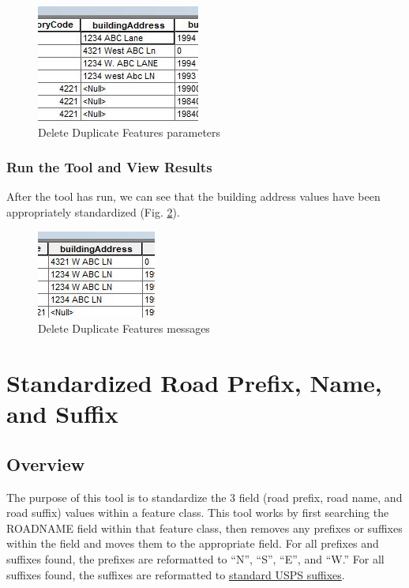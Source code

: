 \documentclass[openany]{book}
\theoremstyle{definition}
\theoremstyle{definition}
\theoremstyle{definition}
\theoremstyle{remark}
\begin{document}
\begin{figure}[H]

{\centering \includegraphics{figures/std1-before} 

}

\caption{Delete Duplicate Features parameters}\label{fig:std1before}
\end{figure}

\subsection{Run the Tool and View
Results}\label{run-the-tool-and-view-results-6}

After the tool has run, we can see that the building address values have
been appropriately standardized (Fig. \ref{fig:std1after}).

\begin{figure}[H]

{\centering \includegraphics{figures/std1-after} 

}

\caption{Delete Duplicate Features messages}\label{fig:std1after}
\end{figure}

\hypertarget{std3}{\chapter{Standardized Road Prefix, Name, and
Suffix}\label{std3}}

\section{Overview}\label{overview-7}

The purpose of this tool is to standardize the 3 field (road prefix,
road name, and road suffix) values within a feature class. This tool
works by first searching the ROADNAME field within that feature class,
then removes any prefixes or suffixes within the field and moves them to
the appropriate field. For all prefixes and suffixes found, the prefixes
are reformatted to ``N'', ``S'', ``E'', and ``W.'' For all suffixes
found, the suffixes are reformatted to
\href{https://github.com/allanbreyes/udacity-data-science/blob/master/p2/data/suffixes.csv}{standard
USPS suffixes}.
\end{document}
